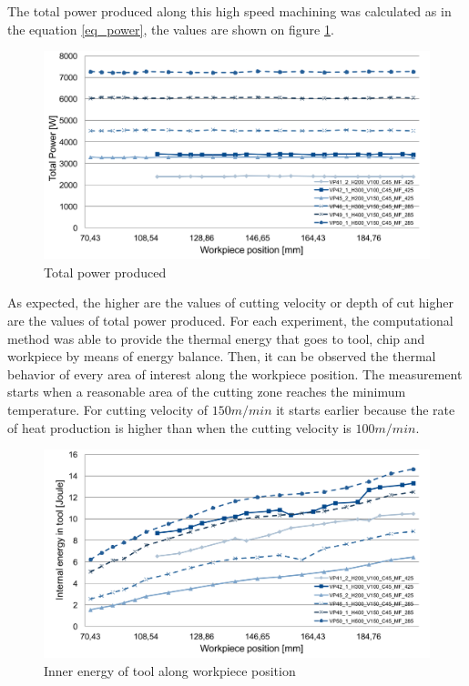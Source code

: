 	The total power produced along this high speed machining was calculated as in the equation \ref{eq_power}, the values are shown on figure \ref{fig:totPower}.

	\begin{figure}[H]
		\centering
		\captionsetup{justification=centering}
		\includegraphics[scale=0.55]{Imagens/Total_power.png}
		\caption{Total power produced}
		\label{fig:totPower}
	\end{figure}

	As expected, the higher are the values of cutting velocity or depth of cut higher are the values of total power produced.
	For each experiment, the computational method was able to provide the thermal energy that goes to tool, chip and workpiece by means of energy balance. Then, it can be observed the thermal behavior of every area of interest along the workpiece position. The measurement starts when a reasonable area of the cutting zone reaches the minimum temperature. For cutting velocity of $150 m/min$ it starts earlier because the rate of heat production is higher than when the cutting velocity is $100 m/min$.

	\begin{figure}[H]
		\centering
		\captionsetup{justification=centering}
		\includegraphics[scale=0.55]{Imagens/Inner_Energy.png}
		\caption{Inner energy of tool along workpiece position}
		\label{fig:innerTool}
	\end{figure}

